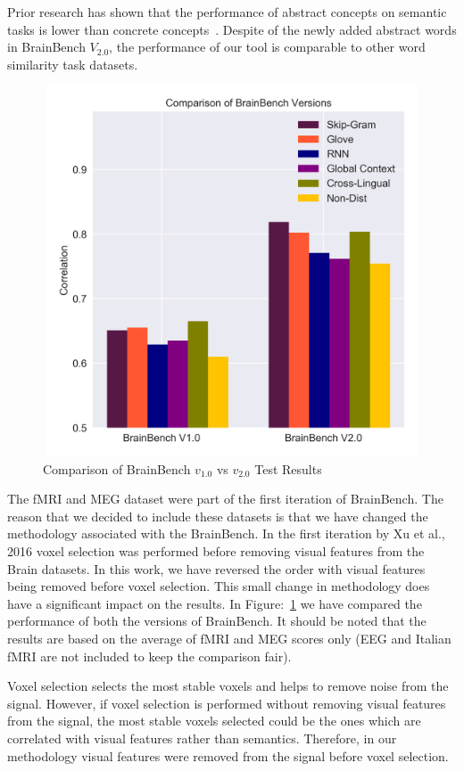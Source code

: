 Prior research has shown that the performance of abstract concepts on semantic tasks is lower than concrete concepts~\cite{AndersonConcreteness}. Despite of the newly added abstract words in BrainBench  $V_{2.0}$, the performance of our tool is comparable to other word similarity task datasets.

\begin{figure}[t]
\centering
\includegraphics[width=12cm, height=11cm]{Figures/Versions}
\caption{Comparison of BrainBench $v_{1.0}$ vs $v_{2.0}$ Test Results}
\label{versions}
\end{figure}
The fMRI and MEG dataset were part of the first iteration of BrainBench. The reason that we decided to include these datasets is that we have changed the methodology associated with the BrainBench. In the first iteration by Xu et al., 2016 voxel selection was performed before removing visual features from the Brain datasets. In this work, we have reversed the order with visual features being removed before voxel selection. This small change in methodology does have a significant impact on the results. In Figure:~\ref{versions} we have compared the performance of both the versions of BrainBench. It should be noted that the results are based on the average of fMRI and MEG scores only (EEG and Italian fMRI are not included to keep the comparison fair).

Voxel selection selects the most stable voxels and helps to remove noise from the signal. However, if voxel selection is performed without removing visual features from the signal, the most stable voxels selected could be the ones which are correlated with visual features rather than semantics. Therefore, in our methodology visual features were removed from the signal before voxel selection.

